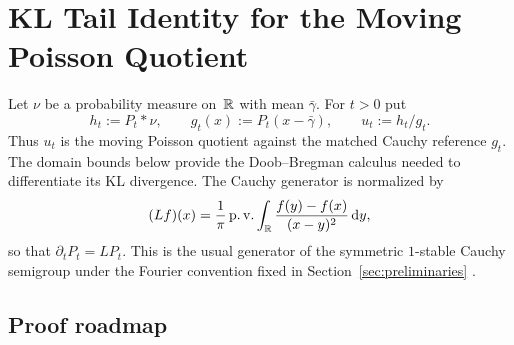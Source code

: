 \section{KL Tail Identity for the Moving Poisson Quotient}%
\label{sec:doob-phi-entropy}

Let \(\nu\) be a probability measure on~\(\mathbb{R}\) with mean \(\bar{\gamma}\).
For \(t>0\) put
\[
h_t:=P_t*\nu,\qquad
g_t(x):=P_t(x-\bar{\gamma}),\qquad
u_t:=h_t/g_t .
\]
Thus \(u_t\) is the moving Poisson quotient against the matched Cauchy
reference \(g_t\).  The domain bounds below provide the Doob--Bregman
calculus needed to differentiate its KL divergence.
The Cauchy generator is normalized by
\[
(Lf)(x)=\frac1\pi\operatorname{p.v.}\int_{\mathbb{R}}
\frac{f(y)-f(x)}{(x-y)^2}\,\mathrm{d} y,
\]
so that \(\partial_tP_t=LP_t\).  This is the usual generator of the symmetric
\(1\)-stable Cauchy semigroup under the Fourier convention fixed in
Section~\ref{sec:preliminaries}
\cite{Feller1971,Bertoin1996LevyProcesses,Sato1999LevyProcesses,
Applebaum2009LevyProcesses,Kwasnicki2017}.

\subsection*{Proof roadmap}

